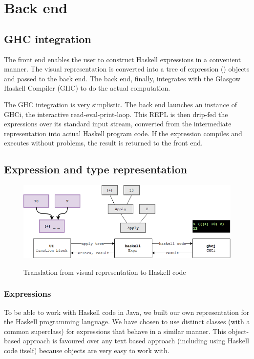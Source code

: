 \section{Back end}

\subsection{GHC integration}

The front end enables the user to construct Haskell expressions in a convenient manner.
The visual representation is converted into a tree of expression () objects and passed to the back end. 
The back end, finally, integrates with the Glasgow Haskell Compiler (\gls{GHC}) to do the actual computation.

The GHC integration is very simplistic.
The back end launches an instance of GHCi, the interactive read-eval-print-loop. 
This \gls{REPL} is then drip-fed the expressions over its standard input stream, converted from the intermediate representation into actual Haskell program code.
If the expression compiles and executes without problems, the result is returned to the front end.

\subsection{Expression and type representation}

\begin{figure}[h]
	\centering
	\includegraphics[scale=0.5]{Images/exprtohaskell}
	\label{fig:exprtohaskell}
	\caption{Translation from visual representation to Haskell code}
\end{figure}

\subsubsection{Expressions}
 

To be able to work with Haskell code in Java, we built our own representation for the Haskell programming language.
We have chosen to use distinct classes (with a common superclass) for expressions that behave in a similar manner.
This object-based approach is favoured over any text based approach (including using Haskell code itself) because objects are very easy to work with.

